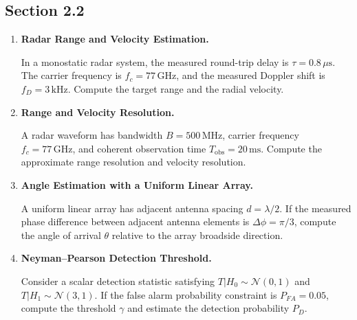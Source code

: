 
\subsection*{Section 2.2}

\begin{enumerate}[label=\textbf{\arabic*.}, leftmargin=*]
    \item \textbf{Radar Range and Velocity Estimation.}

    In a monostatic radar system, the measured round-trip delay is
    \(\tau=0.8\,\mu\mathrm{s}\). The carrier frequency is
    \(f_c=77\,\mathrm{GHz}\), and the measured Doppler shift is
    \(f_D=3\,\mathrm{kHz}\). Compute the target range and the radial velocity.

    \item \textbf{Range and Velocity Resolution.}

    A radar waveform has bandwidth \(B=500\,\mathrm{MHz}\), carrier frequency
    \(f_c=77\,\mathrm{GHz}\), and coherent observation time
    \(T_{\mathrm{obs}}=20\,\mathrm{ms}\). Compute the approximate range
    resolution and velocity resolution.

    \item \textbf{Angle Estimation with a Uniform Linear Array.}

    A uniform linear array has adjacent antenna spacing \(d=\lambda/2\). If
    the measured phase difference between adjacent antenna elements is
    \(\Delta\phi=\pi/3\), compute the angle of arrival \(\theta\) relative to
    the array broadside direction.

    \item \textbf{Neyman--Pearson Detection Threshold.}

    Consider a scalar detection statistic satisfying
    \(T|H_0\sim\mathcal{N}(0,1)\) and
    \(T|H_1\sim\mathcal{N}(3,1)\). If the false alarm probability constraint is
    \(P_{FA}=0.05\), compute the threshold \(\gamma\) and estimate the
    detection probability \(P_D\).
\end{enumerate}
